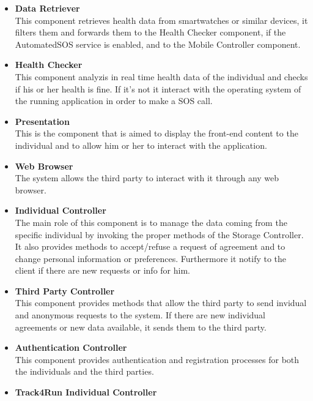 \begin{legal}
\begin{itemize}
		\item{\textbf{Data Retriever}\\
		This component retrieves health data from smartwatches or similar devices, it filters them and forwards them to the Health Checker component, if the AutomatedSOS service is enabled, and to the Mobile Controller component.
				}\\
		\item{\textbf{Health Checker}\\
		This component analyzis in real time health data of the individual and checks if his or her health is fine. If it's not it interact with the operating system of the running application in order to make a SOS call.
				}\\
		\item{\textbf{Presentation}\\
		This is the component that is aimed to display the front-end content to the individual and to allow him or her to interact with the application.
				}\\
		\item{\textbf{Web Browser}\\
		The system allows the third party to interact with it through any web browser.
				}\\
		\item{\textbf{Individual Controller}\\
		The main role of this component is to manage the data coming from the specific individual by invoking the proper methods of the Storage Controller. It also provides methods to accept/refuse a request of agreement and to change personal information or preferences. Furthermore it notify to the client if there are new requests or info for him.
				}\\
		\item{\textbf{Third Party Controller}\\
		This component provides methods that allow the third party to send invidual and anonymous requests to the system. If there are new individual agreements or new data available, it sends them to the third party.
				}\\
		\item{\textbf{Authentication Controller}\\
		This component provides authentication and registration processes for both the individuals and the third parties.
				}\\
		\item{\textbf{Track4Run Individual Controller}\\
}
\end{itemize}
\end{legal}
